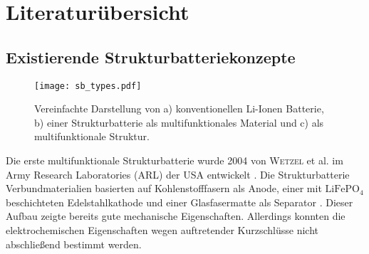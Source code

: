 


\section{\label{sec:Literaturübersicht}Literaturübersicht}

\subsection*{Existierende Strukturbatteriekonzepte}

\begin{figure}[ht]
        \center
	\texttt{[image: sb\_types.pdf]}
		\caption{\label{fig:sb_types}Vereinfachte Darstellung von a) konventionellen Li-Ionen Batterie, b) einer Strukturbatterie als multifunktionales Material und c) als multifunktionale Struktur.}
\end{figure}

Die erste multifunktionale Strukturbatterie wurde 2004 von \textsc{Wetzel} et al. im Army Research Laboratories (ARL) der USA entwickelt \cite{Wetzel2004, Snyder2006, Wong2007, Snyder2007}. Die Strukturbatterie Verbundmaterialien basierten auf Kohlenstofffasern als Anode, einer mit $\text{LiFePO}_\text{4}$ beschichteten Edelstahlkathode und einer Glasfasermatte als Separator \cite{Wong2007}. Dieser Aufbau zeigte bereits gute mechanische Eigenschaften. Allerdings konnten die elektrochemischen Eigenschaften wegen auftretender Kurzschlüsse nicht abschließend bestimmt werden.

